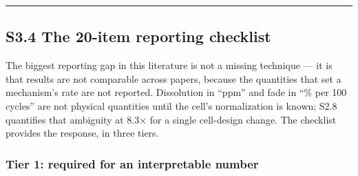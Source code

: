 \documentclass[11pt,a4paper]{article}
\begin{document}
\par\noindent\rule{\linewidth}{0.4pt}\par


\subsection*{S3.4 The 20-item reporting checklist}


The biggest reporting gap in this literature is not a missing technique --- it is that results are not comparable across papers, because the quantities that set a mechanism's rate are not reported. Dissolution in \textquotedblleft{}ppm\textquotedblright{} and fade in \textquotedblleft{}\% per 100 cycles\textquotedblright{} are not physical quantities until the cell's normalization is known; S2.8 quantifies that ambiguity at 8.3\ensuremath{\times} for a single cell-design change. The checklist provides the response, in three tiers.


\subsubsection*{Tier 1: required for an interpretable number}
\end{document}
